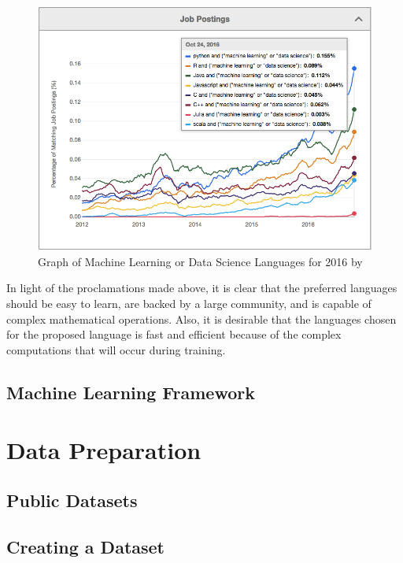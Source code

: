 \begin{figure}[ht]
	\begin{center}
		\advance\leftskip-3cm
		\advance\rightskip-3cm
		\includegraphics[keepaspectratio=true,scale=0.6]{__resources/top_lang.jpg}
		\caption{Graph of Machine Learning or Data Science Languages for 2016 by \cite{verma_2017}}
		\label{verma}
	\end{center}
\end{figure}

In light of the proclamations made above, it is clear that the preferred languages should be easy to learn, are backed by a large community, and is capable of complex mathematical operations. Also, it is desirable that the languages chosen for the proposed language is fast and efficient because of the complex computations that will occur during training.


\subsection{Machine Learning Framework}


\section{Data Preparation}

\subsection{Public Datasets}
\subsection{Creating a Dataset}



